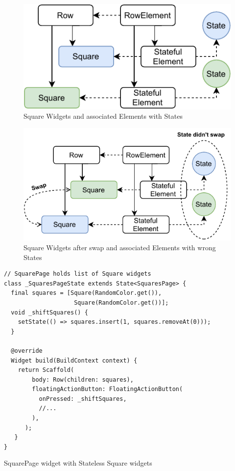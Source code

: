 \begin{figure}[ht]
    \centering
    \includegraphics[width=0.75\linewidth]{img/flutter/key_stateful_start.pdf}
    \caption{Square Widgets and associated Elements with States}
    \label{fig:keys_start}
\end{figure}

\begin{figure}[ht]
    \centering
    \includegraphics[width=0.75\linewidth]{img/flutter/key_stateful_wrong_state.pdf}
    \caption{Square Widgets after swap and associated Elements with wrong States}
    \label{fig:keys_wrong}
\end{figure}

\begin{listing}[ht]
\begin{verbatim}
// SquarePage holds list of Square widgets
class _SquaresPageState extends State<SquaresPage> {
  final squares = [Square(RandomColor.get()), 
                    Square(RandomColor.get())];
  void _shiftSquares() {
    setState(() => squares.insert(1, squares.removeAt(0)));
  }

  @override
  Widget build(BuildContext context) {
    return Scaffold(
        body: Row(children: squares),
        floatingActionButton: FloatingActionButton(
          onPressed: _shiftSquares,
          //...
        ),
      );
   }
}
\end{verbatim}
\caption{SquarePage widget with Stateless Square widgets}
\label{listing:keys_page_stateless}
\end{listing}

